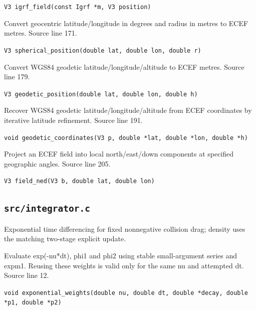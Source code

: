 \begin{description}[style=nextline,leftmargin=0pt,labelindent=0pt,labelwidth=0pt,labelsep=0pt]
{\small\nolinkurl{V3 igrf_field(const Igrf *m, V3 position)}}
\item[\texttt{spherical\_position}] Convert geocentric latitude/longitude in degrees and radius in metres to ECEF metres. Source line 171.\par
{\small\nolinkurl{V3 spherical_position(double lat, double lon, double r)}}
\item[\texttt{geodetic\_position}] Convert WGS84 geodetic latitude/longitude/altitude to ECEF metres. Source line 179.\par
{\small\nolinkurl{V3 geodetic_position(double lat, double lon, double h)}}
\item[\texttt{geodetic\_coordinates}] Recover WGS84 geodetic latitude/longitude/altitude from ECEF coordinates by iterative latitude refinement. Source line 191.\par
{\small\nolinkurl{void geodetic_coordinates(V3 p, double *lat, double *lon, double *h)}}
\item[\texttt{field\_ned}] Project an ECEF field into local north/east/down components at specified geographic angles. Source line 205.\par
{\small\nolinkurl{V3 field_ned(V3 b, double lat, double lon)}}
\end{description}
\subsection{\texttt{src/integrator.c}}
Exponential time differencing for fixed nonnegative collision drag; density uses the matching two-stage explicit update.
\begin{description}[style=nextline,leftmargin=0pt,labelindent=0pt,labelwidth=0pt,labelsep=0pt]
\item[\texttt{exponential\_weights}] Evaluate exp(-nu*dt), phi1 and phi2 using stable small-argument series and expm1. Reusing these weights is valid only for the same nu and attempted dt. Source line 12.\par
{\small\nolinkurl{void exponential_weights(double nu, double dt, double *decay, double *p1, double *p2)}}
\end{description}
